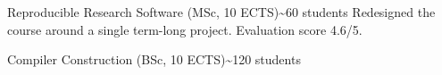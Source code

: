 
  {Reproducible Research Software (MSc, 10 ECTS)}{\textasciitilde 60 students}
  {Redesigned the course around a single term-long project.
   Evaluation score 4.6/5.}

  {Compiler Construction (BSc, 10 ECTS)}{\textasciitilde 120 students}{}

